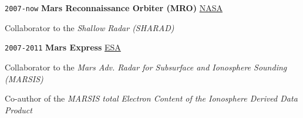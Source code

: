 \noindent \texttt{2007-now} \tab \textbf{Mars Reconnaissance Orbiter (MRO)} \tab
\href{https://mars.nasa.gov/mro/}{NASA}
\begin{adjustwidth}{2.5em}{}
Collaborator to the \textit{Shallow Radar (SHARAD)}
\end{adjustwidth}
\vspace{.5em}

\noindent \texttt{2007-2011} \tab \textbf{Mars Express} \tab
\href{https://www.esa.int/Science_Exploration/Space_Science/Mars_Express}{ESA}
\begin{adjustwidth}{2.5em}{}
Collaborator to the \textit{Mars Adv. Radar for Subsurface and Ionosphere Sounding (MARSIS)}
\end{adjustwidth}
\begin{adjustwidth}{2.5em}{}
Co-author of the \textit{MARSIS total Electron Content of the Ionosphere Derived Data Product}
\end{adjustwidth}
\vspace{.5em}


    
    
    
    
    
    
    
    

